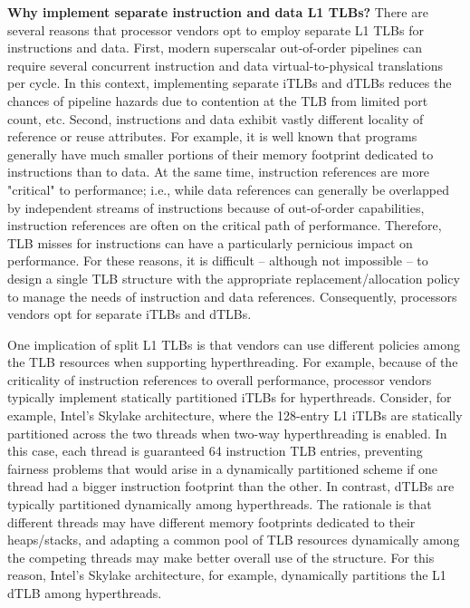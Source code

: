 \documentclass{article}
\begin{document}
\vspace{2mm}
{\noindent \bf Why implement separate instruction and data L1 TLBs?} There are several reasons that processor vendors opt to employ separate L1 TLBs for instructions and data. First, modern superscalar out-of-order pipelines can require several concurrent instruction and data virtual-to-physical translations per cycle. In this context, implementing separate iTLBs and dTLBs reduces the chances of pipeline hazards due to contention at the TLB from limited port count, etc. Second, instructions and data exhibit vastly different locality of reference or reuse attributes. For example, it is well known that programs generally have much smaller portions of their memory footprint dedicated to instructions than to data. At the same time, instruction references are more "critical" to performance; i.e., while data references can generally be overlapped by independent streams of instructions because of out-of-order capabilities, instruction references are often on the critical path of performance. Therefore, TLB misses for instructions can have a particularly pernicious impact on performance. For these reasons, it is difficult -- although not impossible -- to design a single TLB structure with the appropriate replacement/allocation policy to manage the needs of instruction and data references. Consequently, processors vendors opt for separate iTLBs and dTLBs. 

One implication of split L1 TLBs is that vendors can use different policies among the TLB resources when supporting hyperthreading. For example, because of the criticality of instruction references to overall performance, processor vendors typically implement statically partitioned iTLBs for hyperthreads. Consider, for example, Intel's Skylake architecture, where the 128-entry L1 iTLBs are statically partitioned across the two threads when two-way hyperthreading is enabled. In this case, each thread is guaranteed 64 instruction TLB entries, preventing fairness problems that would arise in a dynamically partitioned scheme if one thread had a bigger instruction footprint than the other. In contrast, dTLBs are typically partitioned dynamically among hyperthreads. The rationale is that different threads may have different memory footprints dedicated to their heaps/stacks, and adapting a common pool of TLB resources dynamically among the competing threads may make better overall use of the structure. For this reason, Intel's Skylake architecture, for example, dynamically partitions the L1 dTLB among hyperthreads.
\end{document}
